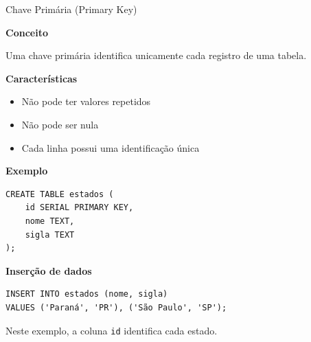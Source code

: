 \documentclass{beamer}
\begin{document}
\begin{frame}[fragile]{Chave Primária (Primary Key)}

\textbf{Conceito}

Uma chave primária identifica unicamente cada registro de uma tabela.

\vspace{0.3cm}

\textbf{Características}

\begin{itemize}
    \item Não pode ter valores repetidos
    \item Não pode ser nula
    \item Cada linha possui uma identificação única
\end{itemize}

\vspace{0.3cm}

\textbf{Exemplo}

\begin{verbatim}
CREATE TABLE estados (
    id SERIAL PRIMARY KEY,
    nome TEXT,
    sigla TEXT
);
\end{verbatim}

\vspace{0.2cm}

\textbf{Inserção de dados}

\begin{verbatim}
INSERT INTO estados (nome, sigla)
VALUES ('Paraná', 'PR'), ('São Paulo', 'SP');
\end{verbatim}

\vspace{0.2cm}

Neste exemplo, a coluna \texttt{id} identifica cada estado.

\end{frame}
\end{document}
